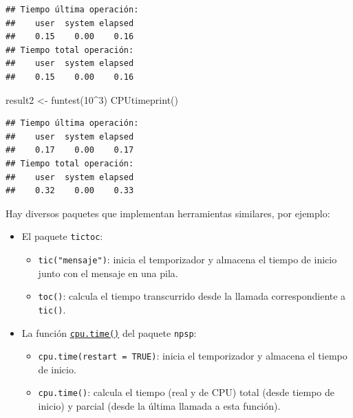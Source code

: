 \documentclass[
]{book}
\newenvironment{Shaded}{\begin{snugshade}}{\end{snugshade}}
\newcommand{\DecValTok}[1]{\textcolor[rgb]{0.00,0.00,0.81}{#1}}
\newcommand{\FunctionTok}[1]{\textcolor[rgb]{0.00,0.00,0.00}{#1}}
\newcommand{\NormalTok}[1]{#1}
\newcommand{\OtherTok}[1]{\textcolor[rgb]{0.56,0.35,0.01}{#1}}
\newcommand{\SpecialCharTok}[1]{\textcolor[rgb]{0.00,0.00,0.00}{#1}}
\theoremstyle{break}
\theoremstyle{definition}
\theoremstyle{definition}
\theoremstyle{definition}
\theoremstyle{definition}
\theoremstyle{remark}
\begin{document}
\begin{verbatim}
## Tiempo última operación:
##    user  system elapsed 
##    0.15    0.00    0.16 
## Tiempo total operación:
##    user  system elapsed 
##    0.15    0.00    0.16
\end{verbatim}

\begin{Shaded}
\begin{Highlighting}[]
\NormalTok{result2 }\OtherTok{\textless{}{-}} \FunctionTok{funtest}\NormalTok{(}\DecValTok{10}\SpecialCharTok{\^{}}\DecValTok{3}\NormalTok{)}
\FunctionTok{CPUtimeprint}\NormalTok{()}
\end{Highlighting}
\end{Shaded}

\begin{verbatim}
## Tiempo última operación:
##    user  system elapsed 
##    0.17    0.00    0.17 
## Tiempo total operación:
##    user  system elapsed 
##    0.32    0.00    0.33
\end{verbatim}

Hay diversos paquetes que implementan herramientas similares, por ejemplo:

\begin{itemize}
\item
  El paquete \texttt{tictoc}:

  \begin{itemize}
  \item
    \texttt{tic("mensaje")}: inicia el temporizador y almacena el tiempo de inicio junto con el mensaje en una pila.
  \item
    \texttt{toc()}: calcula el tiempo transcurrido desde la llamada correspondiente a \texttt{tic()}.
  \end{itemize}
\item
  La función \href{https://rubenfcasal.github.io/npsp/reference/cpu.time.html}{\texttt{cpu.time()}} del paquete \texttt{npsp}:

  \begin{itemize}
  \item
    \texttt{cpu.time(restart\ =\ TRUE)}: inicia el temporizador y almacena el tiempo de inicio.
  \item
    \texttt{cpu.time()}: calcula el tiempo (real y de CPU) total (desde tiempo de inicio) y parcial (desde la última llamada a esta función).
  \end{itemize}
\end{itemize}
\end{document}
